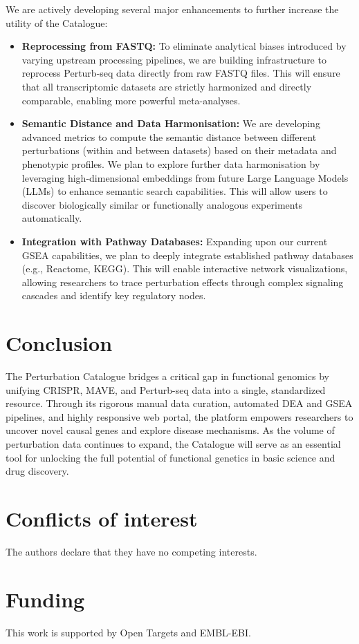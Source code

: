 \documentclass[unnumsec,webpdf,contemporary,large]{oup-authoring-template}
\begin{document}
We are actively developing several major enhancements to further increase the utility of the Catalogue:
\begin{itemize}
    \item \textbf{Reprocessing from FASTQ:} To eliminate analytical biases introduced by varying upstream processing pipelines, we are building infrastructure to reprocess Perturb-seq data directly from raw FASTQ files. This will ensure that all transcriptomic datasets are strictly harmonized and directly comparable, enabling more powerful meta-analyses.
    \item \textbf{Semantic Distance and Data Harmonisation:} We are developing advanced metrics to compute the semantic distance between different perturbations (within and between datasets) based on their metadata and phenotypic profiles. We plan to explore further data harmonisation by leveraging high-dimensional embeddings from future Large Language Models (LLMs) to enhance semantic search capabilities. This will allow users to discover biologically similar or functionally analogous experiments automatically.
    \item \textbf{Integration with Pathway Databases:} Expanding upon our current GSEA capabilities, we plan to deeply integrate established pathway databases (e.g., Reactome, KEGG). This will enable interactive network visualizations, allowing researchers to trace perturbation effects through complex signaling cascades and identify key regulatory nodes.
\end{itemize}

\section{Conclusion}
The Perturbation Catalogue bridges a critical gap in functional genomics by unifying CRISPR, MAVE, and Perturb-seq data into a single, standardized resource. Through its rigorous manual data curation, automated DEA and GSEA pipelines, and highly responsive web portal, the platform empowers researchers to uncover novel causal genes and explore disease mechanisms. As the volume of perturbation data continues to expand, the Catalogue will serve as an essential tool for unlocking the full potential of functional genetics in basic science and drug discovery.

\section{Conflicts of interest}
The authors declare that they have no competing interests.

\section{Funding}
This work is supported by Open Targets and EMBL-EBI.



\end{document}
